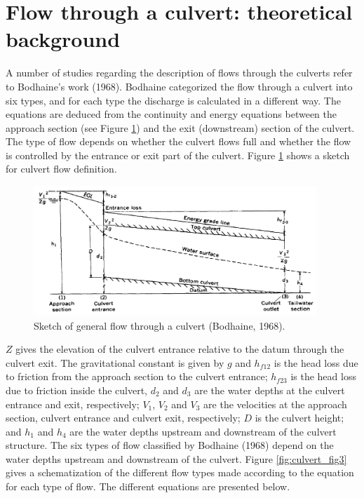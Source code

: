 \section{Flow through a culvert: theoretical background}

A number of studies regarding the description of flows through the culverts
refer to Bodhaine's work (1968).
Bodhaine categorized the flow through a culvert into six types, and for each type
the discharge is calculated in a different way.
The equations are deduced from the continuity and energy equations between the approach
section (see Figure \ref{fig:culvert_fig2}) and the exit (downstream) section of the culvert.
The type of flow depends on whether the culvert flows full and whether the flow is controlled
by the entrance or exit part of the culvert. Figure \ref{fig:culvert_fig2}
shows a sketch for culvert flow definition.

\begin{figure}[H]
\begin{center}
  \includegraphics[width=0.95\textwidth]{culvert_fig2.png}
\end{center}
\caption{Sketch of general flow through a culvert (Bodhaine, 1968).}
\label{fig:culvert_fig2}
\end{figure}

$Z$ gives the elevation of the culvert entrance relative to the datum through the culvert exit.
The gravitational constant is given by $g$ and $h_{f12}$ is the head loss due to friction from
the approach section to the culvert entrance;
$h_{f23}$ is the head loss due to friction inside the culvert, $d_2$ and $d_3$ are the water
depths at the culvert entrance and exit, respectively;
$V_1$, $V_2$ and $V_3$ are the velocities at the approach section,
culvert entrance and culvert exit, respectively;
$D$ is the culvert height;
and $h_1$ and $h_4$ are the water depths upstream and downstream of the culvert structure.
The six types of flow classified by Bodhaine (1968) depend on the water depths
upstream and downstream of the culvert.
Figure \ref{fig:culvert_fig3} gives a schematization of the different flow types
made according to the equation for each type of flow.
The different equations are presented below.

